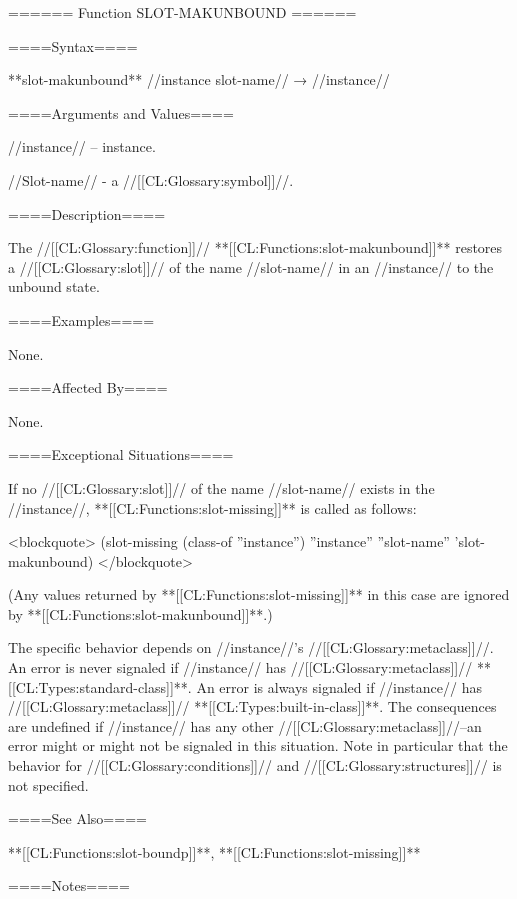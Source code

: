 ====== Function SLOT-MAKUNBOUND ======

====Syntax====

**{slot-makunbound}** //instance slot-name// → //instance//

====Arguments and Values====

//instance// -- instance.

//Slot-name// - a //[[CL:Glossary:symbol]]//.

====Description====

The //[[CL:Glossary:function]]// **[[CL:Functions:slot-makunbound]]** restores a //[[CL:Glossary:slot]]// of the name //slot-name// in an //instance// to the unbound state.

====Examples====

None.

====Affected By====

None.

====Exceptional Situations====

If no //[[CL:Glossary:slot]]// of the name //slot-name// exists in the //instance//, **[[CL:Functions:slot-missing]]** is called as follows:

<blockquote> (slot-missing (class-of ''instance'') ''instance'' ''slot-name'' 'slot-makunbound) </blockquote>

(Any values returned by **[[CL:Functions:slot-missing]]** in this case are ignored by **[[CL:Functions:slot-makunbound]]**.)



The specific behavior depends on //instance//'s //[[CL:Glossary:metaclass]]//. An error is never signaled if //instance// has //[[CL:Glossary:metaclass]]// **[[CL:Types:standard-class]]**. An error is always signaled if //instance// has //[[CL:Glossary:metaclass]]// **[[CL:Types:built-in-class]]**. The consequences are undefined if //instance// has any other //[[CL:Glossary:metaclass]]//--an error might or might not be signaled in this situation. Note in particular that the behavior for //[[CL:Glossary:conditions]]// and //[[CL:Glossary:structures]]// is not specified.


====See Also====

**[[CL:Functions:slot-boundp]]**, **[[CL:Functions:slot-missing]]**

====Notes====



 
